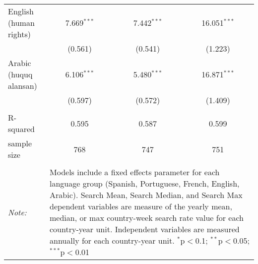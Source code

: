 \begin{table}[!htbp]
\begin{tabular}{@{\extracolsep{5pt}}lccc}
  English (human rights) & 7.669$^{***}$ & 7.442$^{***}$ & 16.051$^{***}$ \\ 
  & (0.561) & (0.541) & (1.223) \\ 
  Arabic (huquq alansan) & 6.106$^{***}$ & 5.480$^{***}$ & 16.871$^{***}$ \\ 
  & (0.597) & (0.572) & (1.409) \\ 
 \hline \\[-1.8ex] 
R-squared  & 0.595 & 0.587 & 0.599 \\ 
sample size  & 768 & 747 & 751 \\ 
\hline 
\hline \\[-1.8ex] 
\textit{Note:}  & \multicolumn{3}{l}{\parbox[t]{8cm}{Models include a fixed effects parameter for each language group (Spanish, Portuguese, French, English, Arabic). Search Mean, Search Median, and Search Max dependent variables are measure of the yearly mean, median, or max country-week search rate value for each country-year unit. Independent variables are measured annually for each country-year unit. $^{*}$p$<$0.1; $^{**}$p$<$0.05; $^{***}$p$<$0.01}} \\ 
\end{tabular} 
\end{table} 
